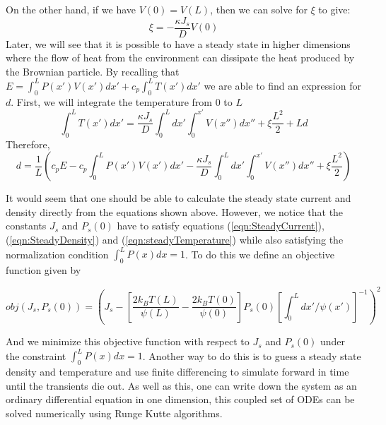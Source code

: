 On the other hand, if we have $V(0) = V(L)$, then we can solve for $\xi$ to give:
\begin{equation}
\xi = - \frac{\kappa J_s}{D} V(0)
\end{equation}
Later, we will see that it is possible to have a steady state in higher dimensions where the flow of heat from the environment can dissipate the heat produced by the Brownian particle. By recalling that $E = \int_0^L P(x') V(x') dx' + c_p \int_0^L T(x') dx'$ we are able to find an expression for $d$. First, we will integrate the temperature from $0$ to $L$
\begin{equation}
\int_0^L T(x') dx' = \frac{\kappa J_s}{D} \int_0^L dx' \int_0^{x'} V(x'') dx'' + \xi \frac{L^2}{2} + L d
\end{equation}
Therefore,
\begin{equation}
	d = \frac{1}{L} \left(c_p E - c_p \int_0^L P(x') V(x') dx' - \frac{\kappa J_s}{D} \int_0^L dx' \int_0^{x'} V(x'') d x'' + \xi \frac{L^2}{2} \right)
\end{equation}

It would seem that one should be able to calculate the steady state current and density directly from the equations shown above. However, we notice that the constants $J_s$ and $P_s(0)$ have to satisfy equations (\ref{eqn:SteadyCurrent}), (\ref{eqn:SteadyDensity}) and (\ref{eqn:steadyTemperature}) while also satisfying the normalization condition $\int_0^L P(x) dx = 1$. To do this we define an objective function given by

\begin{equation}
obj(J_s, P_s(0)) = \left (J_s - \left [\frac{2 k_B T(L)}{\psi(L)} - \frac{2 k_B T(0)}{\psi(0)}  \right] P_s(0) \left [\int_0^L dx'/\psi(x') \right]^{-1} \right)^2  \label{eqn:Objective}
\end{equation}

And we minimize this objective function with respect to $J_s$ and $P_s(0)$ under the constraint $\int_0^L P(x) dx = 1$. Another way to do this is to guess a steady state density and temperature and use finite differencing to simulate forward in time until the transients die out. As well as this, one can write down the system as an ordinary differential equation in one dimension, this coupled set of ODEs can be solved numerically using Runge Kutte algorithms. 

